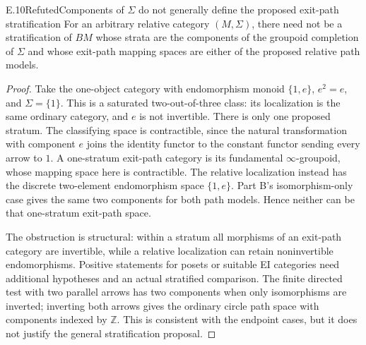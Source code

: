 \begin{result}{E.10}{Refuted}{Components of $\Sigma$ do not generally define the proposed exit-path stratification}
For an arbitrary relative category $(M,\Sigma)$, there need not be a stratification of $BM$ whose strata are the components of the groupoid completion of $\Sigma$ and whose exit-path mapping spaces are either of the proposed relative path models.
\end{result}
\begin{proof}
Take the one-object category with endomorphism monoid $\{1,e\}$, $e^2=e$, and $\Sigma=\{1\}$. This is a saturated two-out-of-three class: its localization is the same ordinary category, and $e$ is not invertible. There is only one proposed stratum. The classifying space is contractible, since the natural transformation with component $e$ joins the identity functor to the constant functor sending every arrow to $1$. A one-stratum exit-path category is its fundamental $\infty$-groupoid, whose mapping space here is contractible. The relative localization instead has the discrete two-element endomorphism space $\{1,e\}$. Part B's isomorphism-only case gives the same two components for both path models. Hence neither can be that one-stratum exit-path space.

The obstruction is structural: within a stratum all morphisms of an exit-path category are invertible, while a relative localization can retain noninvertible endomorphisms. Positive statements for posets or suitable EI categories need additional hypotheses and an actual stratified comparison. The finite directed test with two parallel arrows has two components when only isomorphisms are inverted; inverting both arrows gives the ordinary circle path space with components indexed by $\mathbb Z$. This is consistent with the endpoint cases, but it does not justify the general stratification proposal.
\end{proof}

